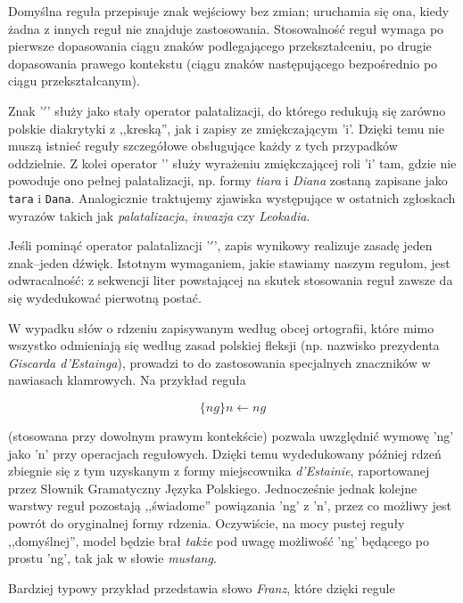 \documentclass{article}
\begin{document}
Domyślna reguła przepisuje znak wejściowy bez zmian; uruchamia się ona, kiedy żadna z innych reguł nie znajduje zastosowania. Stosowalność reguł wymaga po pierwsze dopasowania ciągu znaków podlegającego przekształceniu, po drugie dopasowania prawego kontekstu (ciągu znaków następującego bezpośrednio po ciągu przekształcanym).

Znak '$'$' służy jako stały operator palatalizacji, do którego redukują się zarówno polskie diakrytyki z ,,kreską'', jak i zapisy ze zmiękczającym 'i'.
Dzięki temu nie muszą istnieć reguły szczegółowe obsługujące każdy z tych przypadków oddzielnie.
Z kolei operator '' służy wyrażeniu zmiękczającej roli 'i' tam, gdzie nie powoduje ono pełnej palatalizacji, np. formy \textit{tiara} i \textit{Diana}
zostaną zapisane jako \texttt{tara} i \texttt{Dana}.
Analogicznie traktujemy zjawiska występujące w ostatnich zgłoskach wyrazów takich jak \textit{palatalizacja}, \textit{inwazja} czy \textit{Leokadia}.

Jeśli pominąć operator palatalizacji  '$'$', zapis wynikowy realizuje zasadę jeden znak--jeden dźwięk.
Istotnym wymaganiem, jakie stawiamy naszym regułom, jest odwracalność: z sekwencji liter powstającej
na skutek stosowania reguł zawsze da się wydedukować pierwotną postać.

W wypadku słów o rdzeniu zapisywanym według obcej ortografii, które mimo wszystko odmieniają się według zasad polskiej fleksji
(np. nazwisko prezydenta \textit{Giscarda d'Estainga}), prowadzi to do zastosowania specjalnych znaczników w nawiasach klamrowych.
Na przykład reguła

\begin{equation}
\{ng\}n \leftarrow ng
\end{equation}

(stosowana przy dowolnym prawym kontekście) pozwala uwzględnić wymowę 'ng' jako 'n' przy operacjach regułowych. Dzięki temu wydedukowany później rdzeń zbiegnie się z tym uzyskanym z formy miejscownika \textit{d’Estainie}, raportowanej przez Słownik Gramatyczny Języka Polskiego. Jednocześnie jednak kolejne warstwy reguł pozostają ,,świadome'' powiązania 'ng' z 'n', przez co możliwy jest powrót do oryginalnej formy rdzenia. Oczywiście, na mocy pustej reguły ,,domyślnej'', model będzie brał \textit{także} pod uwagę możliwość 'ng' będącego po prostu 'ng', tak jak w słowie \textit{mustang}.

Bardziej typowy przykład przedstawia słowo \textit{Franz}, które dzięki regule
\end{document}
